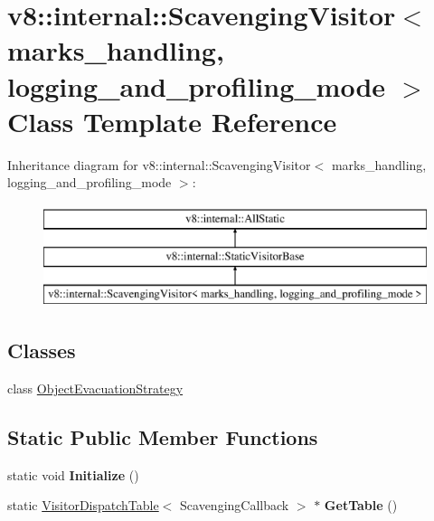 \hypertarget{classv8_1_1internal_1_1_scavenging_visitor}{}\section{v8\+:\+:internal\+:\+:Scavenging\+Visitor$<$ marks\+\_\+handling, logging\+\_\+and\+\_\+profiling\+\_\+mode $>$ Class Template Reference}
\label{classv8_1_1internal_1_1_scavenging_visitor}
Inheritance diagram for v8\+:\+:internal\+:\+:Scavenging\+Visitor$<$ marks\+\_\+handling, logging\+\_\+and\+\_\+profiling\+\_\+mode $>$\+:\begin{figure}[H]
\begin{center}
\leavevmode
\includegraphics[height=3.000000cm]{classv8_1_1internal_1_1_scavenging_visitor}
\end{center}
\end{figure}
\subsection*{Classes}
\begin{DoxyCompactItemize}
\item 
class \hyperlink{classv8_1_1internal_1_1_scavenging_visitor_1_1_object_evacuation_strategy}{Object\+Evacuation\+Strategy}
\end{DoxyCompactItemize}
\subsection*{Static Public Member Functions}
\begin{DoxyCompactItemize}
\item 
static void {\bfseries Initialize} ()\hypertarget{classv8_1_1internal_1_1_scavenging_visitor_a67f602b06b4b306ac2e0efb967aa99d6}{}\label{classv8_1_1internal_1_1_scavenging_visitor_a67f602b06b4b306ac2e0efb967aa99d6}

\item 
static \hyperlink{classv8_1_1internal_1_1_visitor_dispatch_table}{Visitor\+Dispatch\+Table}$<$ Scavenging\+Callback $>$ $\ast$ {\bfseries Get\+Table} ()\hypertarget{classv8_1_1internal_1_1_scavenging_visitor_a026e676f9789ecd3cef9210a15d483ec}{}\label{classv8_1_1internal_1_1_scavenging_visitor_a026e676f9789ecd3cef9210a15d483ec}

\end{DoxyCompactItemize}
